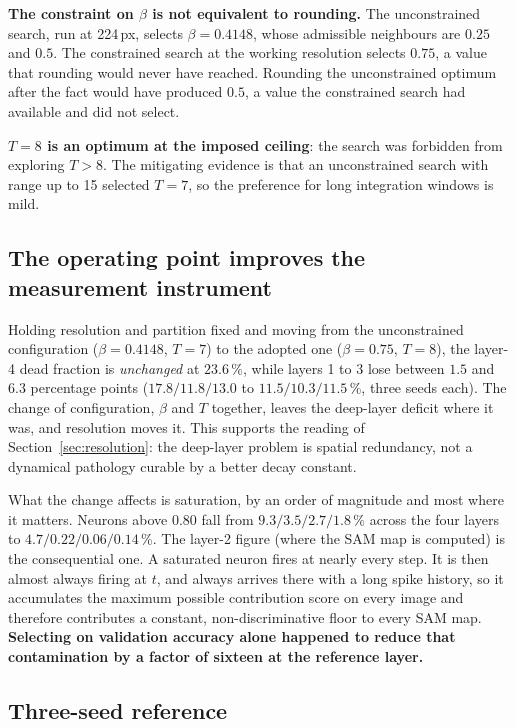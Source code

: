 \textbf{The constraint on $\beta$ is not equivalent to rounding.} The
unconstrained search, run at 224\,px, selects $\beta = 0.4148$, whose admissible
neighbours are $0.25$ and $0.5$. The constrained search at the working resolution
selects $0.75$, a value that rounding would never have reached. Rounding the
unconstrained optimum after the fact would have produced $0.5$, a value the
constrained search had available and did not select.

\textbf{$T = 8$ is an optimum at the imposed ceiling}:
the search was forbidden from exploring $T > 8$. The mitigating evidence is that
an unconstrained search with range up to 15 selected $T = 7$, so the preference
for long integration windows is mild.

\subsection{The operating point improves the measurement instrument}

Holding resolution and partition fixed and moving from the unconstrained
configuration ($\beta = 0.4148$, $T = 7$) to the adopted one ($\beta = 0.75$,
$T = 8$), the layer-4 dead fraction is \emph{unchanged} at $23.6\,\%$, while
layers 1 to 3 lose between $1.5$ and $6.3$ percentage points ($17.8 / 11.8 /
13.0$ to $11.5 / 10.3 / 11.5\,\%$, three seeds each). The change of
configuration, $\beta$ and $T$ together, leaves the deep-layer deficit where it
was, and resolution moves it. This supports the reading of
Section~\ref{sec:resolution}: the deep-layer problem is spatial redundancy, not a
dynamical pathology curable by a better decay constant.

What the change affects is saturation, by an order of magnitude and most
where it matters. Neurons above $0.80$ fall from $9.3 / 3.5 / 2.7 / 1.8$\,\%
across the four layers to $4.7 / 0.22 / 0.06 / 0.14$\,\%. The layer-2 figure 
(where the SAM map is computed) is
the consequential one. A saturated neuron fires at nearly
every step. It is then almost always firing at $t$, and always arrives there
with a long spike history, so it accumulates the maximum
possible contribution score on every image and therefore contributes a constant,
non-discriminative floor to every SAM map. \textbf{Selecting on validation
accuracy alone happened to reduce that contamination by a factor of sixteen at
the reference layer.}

\subsection{Three-seed reference}

